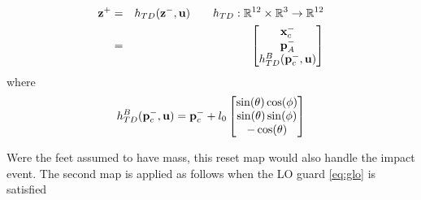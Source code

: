 \begin{eqnarray}
	\mathbf{z}^+ &=& h_{TD}(\mathbf{z}^-,\mathbf{u}) \qquad h_{TD}:\mathbb{R}^{12}\times \mathbb{R}^{3 }  \rightarrow \mathbb{R}^{12} \\
	{}	&=& \begin{bmatrix}
		\mathbf{x}_{c}^- \\
		\mathbf{p}_{A}^- \\
		h_{TD}^{B}(\mathbf{p}_{c}^-, \mathbf{u})
	\end{bmatrix} \nonumber
\end{eqnarray}
where
\begin{equation}
	h_{TD}^{B}(\p_{c}^-, \u) = \p_{c}^- + l_0%
	\begin{bmatrix}
		\sin(\theta)\cos(\phi)\\
		\sin(\theta)\sin(\phi)\\
		-\cos(\theta)
	\end{bmatrix}
\end{equation}

\noindent Were the feet assumed to have mass, this reset map would also handle the impact event. The second map is applied as follows when the LO guard \eqref{eq:glo} is satisfied
%


